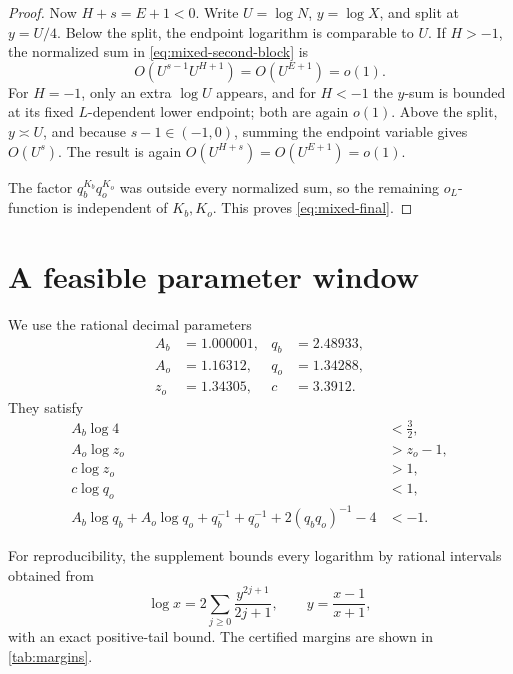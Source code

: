 \documentclass[11pt]{article}
\begin{document}
\begin{proof}
Now \(H+s=E+1<0\). Write \(U=\log N\), \(y=\log X\), and split at
\(y=U/4\). Below the split, the endpoint logarithm is comparable to \(U\).
If \(H>-1\), the normalized sum in \eqref{eq:mixed-second-block} is
\[
 O(U^{s-1}U^{H+1})=O(U^{E+1})=o(1).
\]
For \(H=-1\), only an extra \(\log U\) appears, and for \(H<-1\) the
\(y\)-sum is bounded at its fixed \(L\)-dependent lower endpoint; both are
again \(o(1)\). Above the split, \(y\asymp U\), and because
\(s-1\in(-1,0)\), summing the endpoint variable gives \(O(U^s)\).
The result is again \(O(U^{H+s})=O(U^{E+1})=o(1)\).

The factor \(q_b^{K_b}q_o^{K_o}\) was outside every normalized sum, so the
remaining \(o_L\)-function is independent of \(K_b,K_o\). This proves
\eqref{eq:mixed-final}.
\end{proof}

\section{A feasible parameter window}\label{sec:parameters}

We use the rational decimal parameters
\begin{equation}\label{eq:parameters}
\begin{aligned}
 A_b&=1.000001,&q_b&=2.48933,\\
 A_o&=1.16312,&q_o&=1.34288,\\
 z_o&=1.34305,&c&=3.3912.
\end{aligned}
\end{equation}
They satisfy
\begin{equation}\label{eq:parameter-inequalities}
\begin{aligned}
 A_b\log4&<\frac32,\\
 A_o\log z_o&>z_o-1,\\
 c\log z_o&>1,\\
 c\log q_o&<1,\\
 A_b\log q_b+A_o\log q_o+q_b^{-1}+q_o^{-1}
 +2(q_bq_o)^{-1}-4&<-1.
\end{aligned}
\end{equation}

For reproducibility, the supplement bounds every logarithm by rational
intervals obtained from
\[
 \log x=
 2\sum_{j\geq0}\frac{y^{2j+1}}{2j+1},
\qquad y=\frac{x-1}{x+1},
\]
with an exact positive-tail bound. The certified margins are shown in
\cref{tab:margins}.
\end{document}
